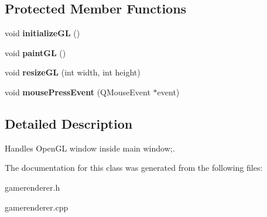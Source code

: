 \subsection*{\-Protected \-Member \-Functions}
\begin{DoxyCompactItemize}
\item 
\hypertarget{classGameRenderer_ada3f9ec6a94622e3942106c35f910c17}{void {\bfseries initialize\-G\-L} ()}\label{classGameRenderer_ada3f9ec6a94622e3942106c35f910c17}

\item 
\hypertarget{classGameRenderer_afe54bbab14adcee6d4a30c2ac74aea84}{void {\bfseries paint\-G\-L} ()}\label{classGameRenderer_afe54bbab14adcee6d4a30c2ac74aea84}

\item 
\hypertarget{classGameRenderer_a96621b18ee77b658ba49ed13085006ab}{void {\bfseries resize\-G\-L} (int width, int height)}\label{classGameRenderer_a96621b18ee77b658ba49ed13085006ab}

\item 
\hypertarget{classGameRenderer_a88c0cc3a0a2ad5dce8ed5f738e8a7dc0}{void {\bfseries mouse\-Press\-Event} (\-Q\-Mouse\-Event $\ast$event)}\label{classGameRenderer_a88c0cc3a0a2ad5dce8ed5f738e8a7dc0}

\end{DoxyCompactItemize}


\subsection{\-Detailed \-Description}
\-Handles \-Open\-G\-L window inside main window;. 

\-The documentation for this class was generated from the following files\-:\begin{DoxyCompactItemize}
\item 
gamerenderer.\-h\item 
gamerenderer.\-cpp\end{DoxyCompactItemize}
